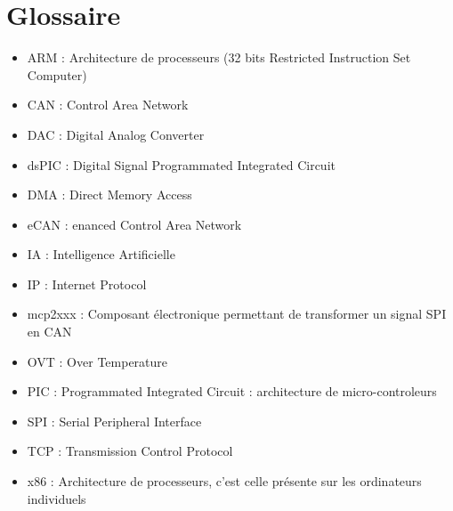 \documentclass[a4,french,12pt]{article}
\begin{document}
\newpage
\section{Glossaire}
\begin{itemize}
  \item ARM : Architecture de processeurs (32 bits Restricted Instruction Set Computer)
  \item CAN : Control Area Network
  \item DAC : Digital Analog Converter
  \item dsPIC : Digital Signal Programmated Integrated Circuit
  \item DMA : Direct Memory Access
  \item eCAN : enanced Control Area Network
  \item IA : Intelligence Artificielle
  \item IP : Internet Protocol
  \item mcp2xxx : Composant électronique permettant de transformer un signal SPI en CAN
  \item OVT : Over Temperature
  \item PIC : Programmated Integrated Circuit : architecture de micro-controleurs
  \item SPI : Serial Peripheral Interface
  \item TCP : Transmission Control Protocol
  \item x86 : Architecture de processeurs, c'est celle présente sur les ordinateurs individuels 
\end{itemize}
\end{document}
